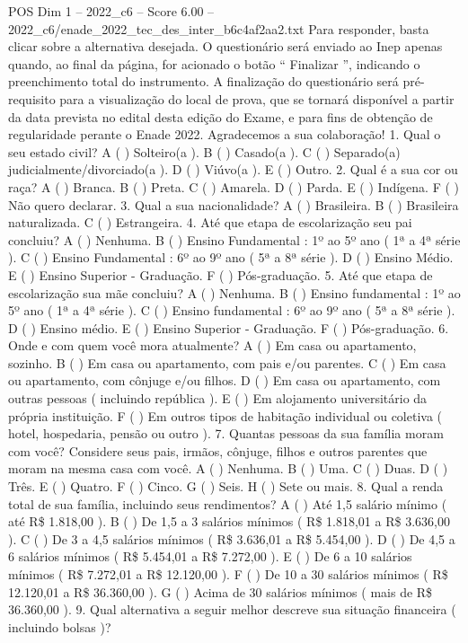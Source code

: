 \begin{textsample}{POS Dim 1 – 2022\_c6 – Score 6.00 – 2022\_c6/enade\_2022\_tec\_des\_inter\_b6c4af2aa2.txt}
Para responder, basta clicar sobre a alternativa desejada.
O questionário será enviado ao Inep apenas quando, ao final da página, for acionado o botão “ Finalizar ”, indicando o preenchimento total do instrumento.
A finalização do questionário será pré-requisito para a visualização do local de prova, que se tornará disponível a partir da data prevista no edital desta edição do Exame, e para fins de obtenção de regularidade perante o Enade 2022.
Agradecemos a sua colaboração! 1.
Qual o seu estado civil?
A ( ) Solteiro(a ).
B ( ) Casado(a ).
C ( ) Separado(a) judicialmente/divorciado(a ).
D ( ) Viúvo(a ).
E ( ) Outro. 2.
Qual é a sua cor ou raça?
A ( ) Branca.
B ( ) Preta.
C ( ) Amarela.
D ( ) Parda.
E ( ) Indígena.
F ( ) Não quero declarar. 3.
Qual a sua nacionalidade?
A ( ) Brasileira.
B ( ) Brasileira naturalizada.
C ( ) Estrangeira. 4.
Até que etapa de escolarização seu pai concluiu?
A ( ) Nenhuma.
B ( ) Ensino Fundamental : 1º ao 5º ano ( 1ª a 4ª série ).
C ( ) Ensino Fundamental : 6º ao 9º ano ( 5ª a 8ª série ).
D ( ) Ensino Médio.
E ( ) Ensino Superior - Graduação.
F ( ) Pós-graduação. 5.
Até que etapa de escolarização sua mãe concluiu?
A ( ) Nenhuma.
B ( ) Ensino fundamental : 1º ao 5º ano ( 1ª a 4ª série ).
C ( ) Ensino fundamental : 6º ao 9º ano ( 5ª a 8ª série ).
D ( ) Ensino médio.
E ( ) Ensino Superior - Graduação.
F ( ) Pós-graduação. 6.
Onde e com quem você mora atualmente?
A ( ) Em casa ou apartamento, sozinho.
B ( ) Em casa ou apartamento, com pais e/ou parentes.
C ( ) Em casa ou apartamento, com cônjuge e/ou filhos.
D ( ) Em casa ou apartamento, com outras pessoas ( incluindo república ).
E ( ) Em alojamento universitário da própria instituição.
F ( ) Em outros tipos de habitação individual ou coletiva ( hotel, hospedaria, pensão ou outro ). 7.
Quantas pessoas da sua família moram com você?
Considere seus pais, irmãos, cônjuge, filhos e outros parentes que moram na mesma casa com você.
A ( ) Nenhuma.
B ( ) Uma.
C ( ) Duas.
D ( ) Três.
E ( ) Quatro.
F ( ) Cinco.
G ( ) Seis.
H ( ) Sete ou mais. 8.
Qual a renda total de sua família, incluindo seus rendimentos?
A ( ) Até 1,5 salário mínimo ( até R\$ 1.818,00 ).
B ( ) De 1,5 a 3 salários mínimos ( R\$ 1.818,01 a R\$ 3.636,00 ).
C ( ) De 3 a 4,5 salários mínimos ( R\$ 3.636,01 a R\$ 5.454,00 ).
D ( ) De 4,5 a 6 salários mínimos ( R\$ 5.454,01 a R\$ 7.272,00 ).
E ( ) De 6 a 10 salários mínimos ( R\$ 7.272,01 a R\$ 12.120,00 ).
F ( ) De 10 a 30 salários mínimos ( R\$ 12.120,01 a R\$ 36.360,00 ).
G ( ) Acima de 30 salários mínimos ( mais de R\$ 36.360,00 ). 9.
Qual alternativa a seguir melhor descreve sua situação financeira ( incluindo bolsas )?

\end{textsample}
